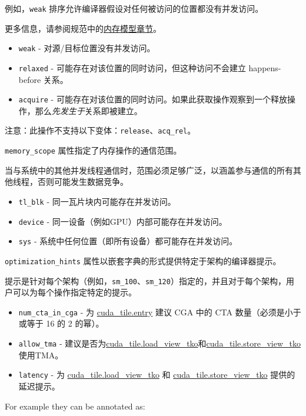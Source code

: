\documentclass{article}
\begin{document}
例如，\texttt{weak} 排序允许编译器假设对任何被访问的位置都没有并发访问。

更多信息，请参阅规范中的\href{https://docs.nvidia.com/cuda/tile-ir/latest/sections/memory_model.html#section-memory-model}{内存模型章节}。


\begin{itemize}
\item \texttt{weak} - 对源/目标位置没有并发访问。
\item \texttt{relaxed} - 可能存在对该位置的同时访问，但这种访问不会建立 happens-before 关系。
\item \texttt{acquire} - 可能存在对该位置的同时访问。如果此获取操作观察到一个释放操作，那么\textit{先发生于}关系即被建立。

\end{itemize}
注意：此操作不支持以下变体：\texttt{release}、\texttt{acq\_rel}。


\texttt{memory\_scope} 属性指定了内存操作的通信范围。

当与系统中的其他并发线程通信时，范围必须足够广泛，以涵盖参与通信的所有其他线程，否则可能发生数据竞争。


\begin{itemize}
\item \texttt{tl\_blk} - 同一瓦片块内可能存在并发访问。
\item \texttt{device} - 同一设备（例如GPU）内部可能存在并发访问。
\item \texttt{sys} - 系统中任何位置（即所有设备）都可能存在并发访问。

\end{itemize}
\texttt{optimization\_hints} 属性以嵌套字典的形式提供特定于架构的编译器提示。


提示是针对每个架构（例如，\texttt{sm\_100}、\texttt{sm\_120}）指定的，并且对于每个架构，用户可以为每个操作指定特定的提示。


\begin{itemize}
\item \texttt{num\_cta\_in\_cga} - 为 \href{https://docs.nvidia.com/cuda/tile-ir/latest/sections/operations.html#op-cuda-tile-entry}{cuda\_tile.entry} 建议 CGA 中的 CTA 数量（必须是小于或等于 16 的 2 的幂）。
\item \texttt{allow\_tma} - 建议是否为\href{https://docs.nvidia.com/cuda/tile-ir/latest/sections/operations.html#op-cuda-tile-load-view-tko}{cuda\_tile.load\_view\_tko}和\href{https://docs.nvidia.com/cuda/tile-ir/latest/sections/operations.html#op-cuda-tile-store-view-tko}{cuda\_tile.store\_view\_tko}使用TMA。
\item \texttt{latency} - 为 \href{https://docs.nvidia.com/cuda/tile-ir/latest/sections/operations.html#op-cuda-tile-load-view-tko}{cuda\_tile.load\_view\_tko} 和 \href{https://docs.nvidia.com/cuda/tile-ir/latest/sections/operations.html#op-cuda-tile-store-view-tko}{cuda\_tile.store\_view\_tko} 提供的延迟提示。

\end{itemize}
For example they can be annotated as:
\end{document}
